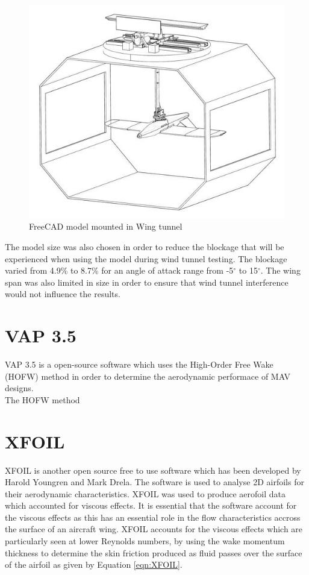 \begin{figure}
    \centering
    \includegraphics{04_Methodology/Figs/ModelWithtunnel.JPG}
    \caption{FreeCAD model mounted in Wing tunnel }
    \label{fig:modelWithTunnel}
\end{figure}

The model size was also chosen in order to reduce the blockage that will be experienced when using the model during wind tunnel testing. The blockage varied from 4.9\% to 8.7\% for an angle of attack range from -5$^\circ$ to 15$^\circ$. The wing span was also limited in size in order to ensure that wind tunnel interference would not influence the results. 


\section{VAP 3.5}
VAP 3.5 is a open-source software which uses the High-Order Free Wake (HOFW)  method in order to determine the aerodynamic performace of MAV designs. \\

The HOFW method


\section{XFOIL}
XFOIL is another open source free to use software which has been developed by Harold Youngren and Mark Drela. The software is used to analyse 2D airfoils for their aerodynamic characteristics. XFOIL was used to produce aerofoil data which accounted for viscous effects. It is essential that the software account for the viscous effects as this has an essential role in the flow characteristics accross the surface of an aircraft wing. XFOIL accounts for the viscous effects which are particularly seen at lower Reynolds numbers, by using the wake momentum thickness to determine the skin friction produced as fluid passes over the surface of the airfoil as given by Equation \ref{eqn:XFOIL}. 


